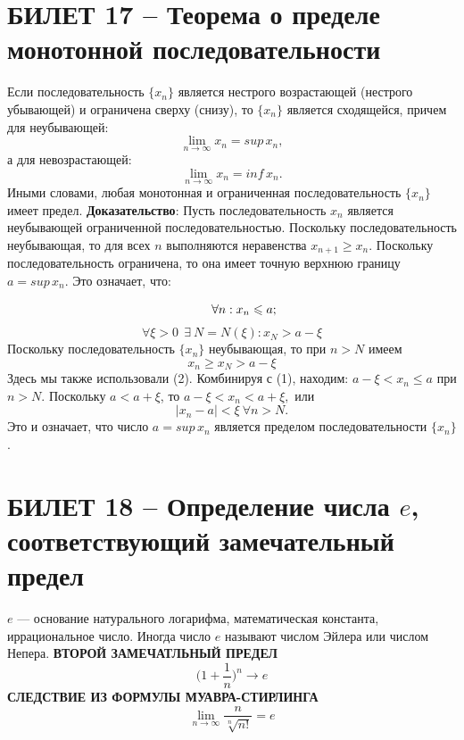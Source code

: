 \documentclass{article}
\begin{document}
\section{БИЛЕТ 17 -- Теорема о пределе монотонной последовательности}
Если последовательность $\{x_{n}\}$  является нестрого возрастающей (нестрого убывающей) и ограничена сверху (снизу), то $\{x_{n}\}$ является сходящейся, причем для неубывающей:
$$ \lim_{n\to\infty} x_{n}=sup\,x_{n}, $$
а для невозрастающей:
$$ \lim_{n\to\infty} x_{n}=inf\,x_{n}. $$
Иными словами, любая монотонная и ограниченная последовательность $\{x_{n}\}$  имеет предел.
\newline
\newline
\textbf{Доказательство}:
\newline
\newline
Пусть последовательность $x_{n}$ является неубывающей ограниченной последовательностью.
Поскольку последовательность неубывающая, то для всех $n$ выполняются неравенства $x_{n+1}\geqslant x_{n}$.\newline
\newline
Поскольку последовательность ограничена, то она имеет точную верхнюю границу $a=sup\,x_{n}$. Это означает, что:

\begin{equation}
\setcounter{equation}{1}
\qquad\forall n: x_{n}\leqslant a;
\end{equation}
\begin{equation}
\forall \xi>0\:\:\exists\: N=N(\xi):x_{N}>a-\xi
\end{equation}
Поскольку последовательность $\{x_{n}\}$ неубывающая, то при $n>N$ имеем 
\begin{equation}
    x_{n}\geqslant x_{N}>a-\xi
\end{equation}
Здесь мы также использовали (2). Комбинируя с (1), находим: $ a-\xi<x_{n}\leqslant a $ при $n>N.$
\newline
Поскольку $a<a+\xi$, то $a-\xi<x_{n}<a+\xi,$ или
$$ |x_{n}-a|<\xi\:\forall n>N. $$
Это и означает, что число $a=sup\,x_{n}$ является пределом последовательности $\{x_{n}\}$.

\newpage
\section{БИЛЕТ 18 -- Определение числа $e$, соответствующий замечательный предел}
$e$ — основание натурального логарифма, математическая константа, иррациональное число. Иногда число $e$ называют числом Эйлера или числом Непера.
\newline
\newline
\textbf{ВТОРОЙ ЗАМЕЧАТЛЬНЫЙ ПРЕДЕЛ}
$$\bigg(1+\frac{1}{n}\bigg)^{n}\to e  $$
\textbf{СЛЕДСТВИЕ ИЗ ФОРМУЛЫ МУАВРА-СТИРЛИНГА}
$$ \lim_{n\to\infty}\frac{n}{\sqrt[n]{n!}}=e $$
\newpage
\end{document}
